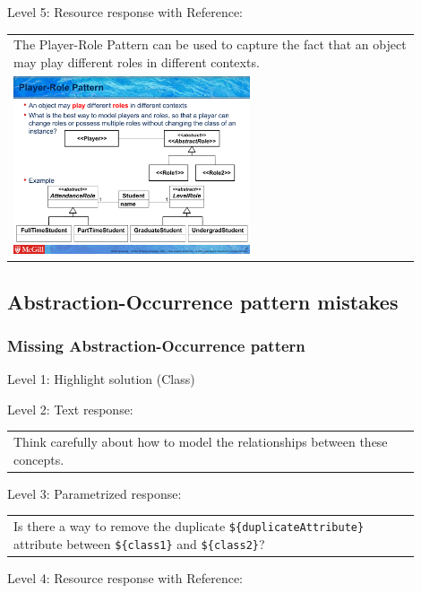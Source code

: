 \noindent Level 5: Resource response with Reference: \medskip

\begin{tabular}{|p{0.9\linewidth}}
The Player-Role Pattern can be used to capture the fact that an object may play different roles
in different contexts.

\\
\includegraphics[width=0.6\textwidth]{images/player_role.png}
\end{tabular} \medskip


\subsection{Abstraction-Occurrence pattern mistakes}

\subsubsection{Missing Abstraction-Occurrence pattern}

\noindent Level 1: Highlight solution (Class) \medskip

\noindent Level 2: Text response: \medskip

\begin{tabular}{|p{0.9\linewidth}}
Think carefully about how to model the relationships between these concepts.
\end{tabular} \medskip

\noindent Level 3: Parametrized response: \medskip

\begin{tabular}{|p{0.9\linewidth}}
Is there a way to remove the duplicate \verb|${duplicateAttribute}| attribute between \verb|${class1}| and \verb|${class2}|?
\end{tabular} \medskip

\noindent Level 4: Resource response with Reference: \medskip

